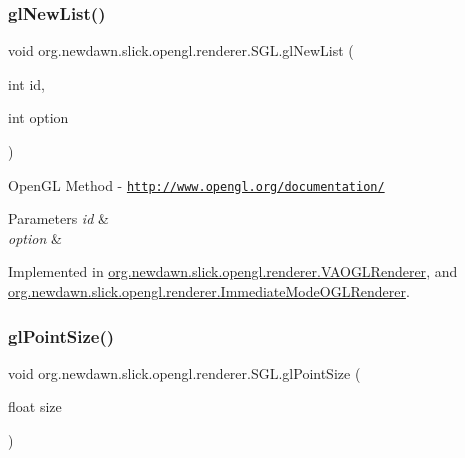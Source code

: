 \subsubsection{\texorpdfstring{gl\+New\+List()}{glNewList()}}
{\footnotesize\ttfamily void org.\+newdawn.\+slick.\+opengl.\+renderer.\+S\+G\+L.\+gl\+New\+List (\begin{DoxyParamCaption}\item[{int}]{id,  }\item[{int}]{option }\end{DoxyParamCaption})}

Open\+GL Method -\/  \href{http://www.opengl.org/documentation/}{\tt http\+://www.\+opengl.\+org/documentation/}


\begin{DoxyParams}{Parameters}
{\em id} & \\
\hline
{\em option} & \\
\hline
\end{DoxyParams}


Implemented in \mbox{\hyperlink{classorg_1_1newdawn_1_1slick_1_1opengl_1_1renderer_1_1_v_a_o_g_l_renderer_af106842219b6ad234609527d83f24e6b}{org.\+newdawn.\+slick.\+opengl.\+renderer.\+V\+A\+O\+G\+L\+Renderer}}, and \mbox{\hyperlink{classorg_1_1newdawn_1_1slick_1_1opengl_1_1renderer_1_1_immediate_mode_o_g_l_renderer_a39396e48f77dfffca38c83a01cf865d9}{org.\+newdawn.\+slick.\+opengl.\+renderer.\+Immediate\+Mode\+O\+G\+L\+Renderer}}.

\mbox{\label{interfaceorg_1_1newdawn_1_1slick_1_1opengl_1_1renderer_1_1_s_g_l_a29b20d7b222979b3edb3f069db9ec467}} 
\subsubsection{\texorpdfstring{gl\+Point\+Size()}{glPointSize()}}
{\footnotesize\ttfamily void org.\+newdawn.\+slick.\+opengl.\+renderer.\+S\+G\+L.\+gl\+Point\+Size (\begin{DoxyParamCaption}\item[{float}]{size }\end{DoxyParamCaption})}

